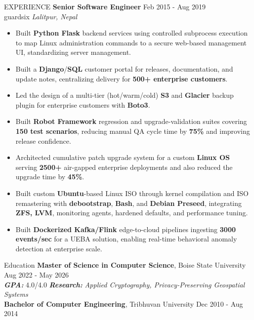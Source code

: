 \documentclass{resume} %
\begin{document}
\begin{rSection}{EXPERIENCE}
\textbf{Senior Software Engineer} \hfill Feb 2015 - Aug 2019\\
guardsix \hfill \textit{Lalitpur, Nepal}
\vspace{-4pt}
\begin{itemize}
    \itemsep -3pt {}
     \item Built \textbf{Python Flask} backend services using controlled subprocess execution to map Linux administration commands to a secure web-based management UI, standardizing server management.
    \item Built a \textbf{Django}/\textbf{SQL} customer portal for releases, documentation, and update notes, centralizing delivery for \textbf{500+ enterprise customers}.
    \item Led the design of a multi-tier (hot/warm/cold) \textbf{S3} and \textbf{Glacier} backup plugin for enterprise customers with \textbf{Boto3}.
    \item Built \textbf{Robot Framework} regression and upgrade-validation suites covering \textbf{150 test scenarios}, reducing manual QA cycle time by \textbf{75\%} and improving release confidence.
    \item Architected cumulative patch upgrade system for a custom \textbf{Linux OS} serving \textbf{2500+} air-gapped enterprise deployments and also reduced the upgrade time by \textbf{45\%}.
    \item Built custom \textbf{Ubuntu}-based Linux ISO through kernel compilation and ISO remastering with \textbf{debootstrap}, \textbf{Bash}, and \textbf{Debian Preseed}, integrating \textbf{ZFS, LVM}, monitoring agents, hardened defaults, and performance tuning.
    \item Built \textbf{Dockerized Kafka/Flink} edge-to-cloud pipelines ingesting \textbf{3000 events/sec} for a UEBA solution, enabling real-time behavioral anomaly detection at enterprise scale.
\end{itemize}
\end{rSection}

\begin{rSection}{Education}
{\bf Master of Science in Computer Science}, Boise State University \hfill {Aug 2022 - May 2026}\\
\hspace*{1em} \textit{\textbf{GPA:}} 4.0/4.0 \textbar{} \textit{\textbf{Research:}} \textit{Applied Cryptography, Privacy-Preserving Geospatial Systems}\\
{\bf Bachelor of Computer Engineering}, Tribhuvan University \hfill {Dec 2010 - Aug 2014}
\end{rSection}
\end{document}
